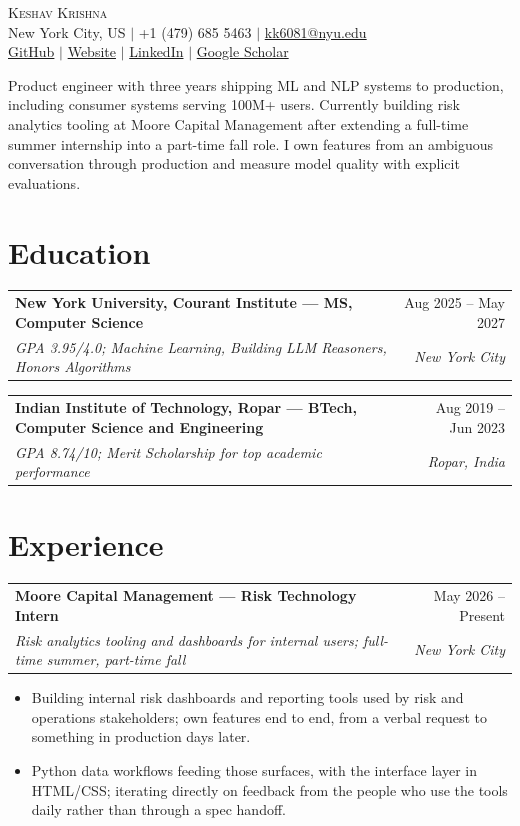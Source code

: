 \documentclass[10pt,letterpaper]{article}
\makeatletter
\newcommand{\entry}[4]{%
  \begin{tabularx}{\textwidth}{@{}Xr@{}}
    \textbf{#1} & #2 \\
    \textit{#3} & \textit{#4}
  \end{tabularx}\vspace{-0.2em}
}
\makeatother
\begin{document}
\fontsize{10.4}{13.2}\selectfont

\begin{center}
  {\fontsize{24}{27}\selectfont\scshape Keshav Krishna}\\[0.15em]
  New York City, US $\mid$ +1 (479) 685 5463 $\mid$ \href{mailto:kk6081@nyu.edu}{kk6081@nyu.edu}\\[-0.05em]
  \href{https://github.com/k-keshav-k}{GitHub} $\mid$
  \href{https://k-keshav-k.github.io/}{Website} $\mid$
  \href{https://www.linkedin.com/in/keshav-krishna-5054681a9/}{LinkedIn} $\mid$
  \href{https://scholar.google.com/citations?user=zN7P_v4AAAAJ}{Google Scholar}
\end{center}

\vspace{0.35em}
Product engineer with three years shipping ML and NLP systems to production, including consumer systems serving 100M+ users. Currently building risk analytics tooling at Moore Capital Management after extending a full-time summer internship into a part-time fall role. I own features from an ambiguous conversation through production and measure model quality with explicit evaluations.

\section{Education}

\entry{New York University, Courant Institute --- MS, Computer Science}{Aug 2025 -- May 2027}{GPA 3.95/4.0; Machine Learning, Building LLM Reasoners, Honors Algorithms}{New York City}

\vspace{0.45em}
\entry{Indian Institute of Technology, Ropar --- BTech, Computer Science and Engineering}{Aug 2019 -- Jun 2023}{GPA 8.74/10; Merit Scholarship for top academic performance}{Ropar, India}

\vspace{0.65em}
\section{Experience}

\entry{Moore Capital Management --- Risk Technology Intern}{May 2026 -- Present}{Risk analytics tooling and dashboards for internal users; full-time summer, part-time fall}{New York City}
\begin{itemize}
  \item Building internal risk dashboards and reporting tools used by risk and operations stakeholders; own features end to end, from a verbal request to something in production days later.
  \item Python data workflows feeding those surfaces, with the interface layer in HTML/CSS; iterating directly on feedback from the people who use the tools daily rather than through a spec handoff.
\end{itemize}
\end{document}

